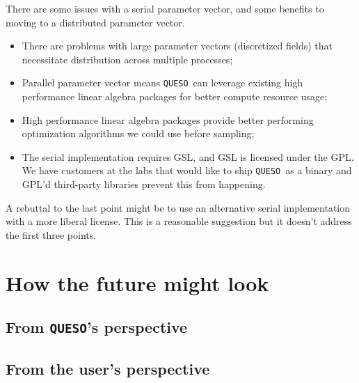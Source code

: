 \documentclass{article}
\newcommand{\Queso}{\texttt{QUESO}}
\begin{document}
There are some issues with a serial parameter vector, and some benefits to
moving to a distributed parameter vector.
\begin{itemize}
  \item There are problems with large parameter vectors (discretized fields)
    that necessitate distribution across multiple processes;
  \item Parallel parameter vector means \Queso\ can leverage existing high
    performance linear algebra packages for better compute resource usage;
  \item High performance linear algebra packages provide better performing
    optimization algorithms we could use before sampling;
  \item The serial implementation requires GSL, and GSL is licensed under the
    GPL.  We have customers at the labs that would like to ship \Queso\ as a
    binary and GPL'd third-party libraries prevent this from happening.
\end{itemize}
A rebuttal to the last point might be to use an alternative serial
implementation with a more liberal license.  This is a reasonable suggestion
but it doesn't address the first three points.

\section{How the future might look}

\subsection{From \Queso's perspective}
\subsection{From the user's perspective}
\end{document}
